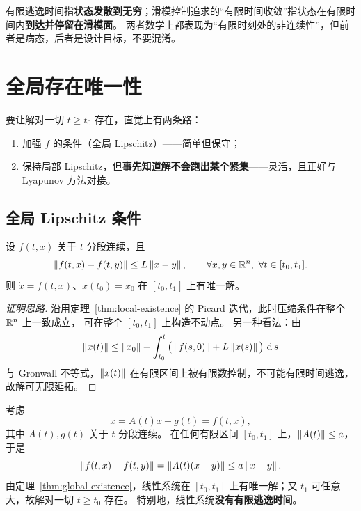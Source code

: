 \begin{remark}
  有限逃逸时间指\textbf{状态发散到无穷}；滑模控制追求的“有限时间收敛”指状态在有限时间内\textbf{到达并停留在滑模面}。
  两者数学上都表现为“有限时刻处的非连续性”，但前者是病态，后者是设计目标，不要混淆。
\end{remark}

\section{全局存在唯一性}\label{sec:global-existence}

要让解对一切 $t\ge t_0$ 存在，直觉上有两条路：
\begin{enumerate}
  \item 加强 $f$ 的条件（全局 Lipschitz）——简单但保守；
  \item 保持局部 Lipschitz，但\textbf{事先知道解不会跑出某个紧集}——灵活，且正好与 Lyapunov 方法对接。
\end{enumerate}

\subsection{全局 Lipschitz 条件}

\begin{theorem}[全局存在唯一性]\label{thm:global-existence}
  设 $f(t,x)$ 关于 $t$ 分段连续，且
  \begin{equation}
    \left\lVert f(t,x)-f(t,y)\right\rVert\le L\left\lVert x-y\right\rVert,
    \qquad \forall x,y\in\mathbb{R}^n,\ \forall t\in[t_0,t_1].
  \end{equation}
  则 $\dot x=f(t,x)$、$x(t_0)=x_0$ 在 $[t_0,t_1]$ 上有唯一解。
  \cite[Theorem 3.2]{khalilNonlinearSystems}\cite[Lemma 1.2]{khalilNonlinearControl2015}
\end{theorem}

\begin{proof}[证明思路]
  沿用定理~\ref{thm:local-existence} 的 Picard 迭代，此时压缩条件在整个 $\mathbb{R}^n$ 上一致成立，
  可在整个 $[t_0,t_1]$ 上构造不动点。
  另一种看法：由
  \[
    \left\lVert x(t)\right\rVert\le\left\lVert x_0\right\rVert+\int_{t_0}^{t}\big(\left\lVert f(s,0)\right\rVert+L\left\lVert x(s)\right\rVert\big)\,\operatorname{d} s
  \]
  与 Gronwall 不等式，$\left\lVert x(t)\right\rVert$ 在有限区间上被有限数控制，不可能有限时间逃逸，
  故解可无限延拓。
\end{proof}

\begin{example}[线性系统]\label{ex:linear-global}
  考虑
  \begin{equation}
    \dot x=A(t)x+g(t)=f(t,x),
  \end{equation}
  其中 $A(t),g(t)$ 关于 $t$ 分段连续。
  在任何有限区间 $[t_0,t_1]$ 上，$\left\lVert A(t)\right\rVert\le a$，于是
  \[
    \left\lVert f(t,x)-f(t,y)\right\rVert=\left\lVert A(t)(x-y)\right\rVert\le a\left\lVert x-y\right\rVert.
  \]
  由定理~\ref{thm:global-existence}，线性系统在 $[t_0,t_1]$ 上有唯一解；又 $t_1$ 可任意大，故解对一切 $t\ge t_0$ 存在。
  特别地，线性系统\textbf{没有有限逃逸时间}。
  \cite[Example 3.4]{khalilNonlinearSystems}
\end{example}

